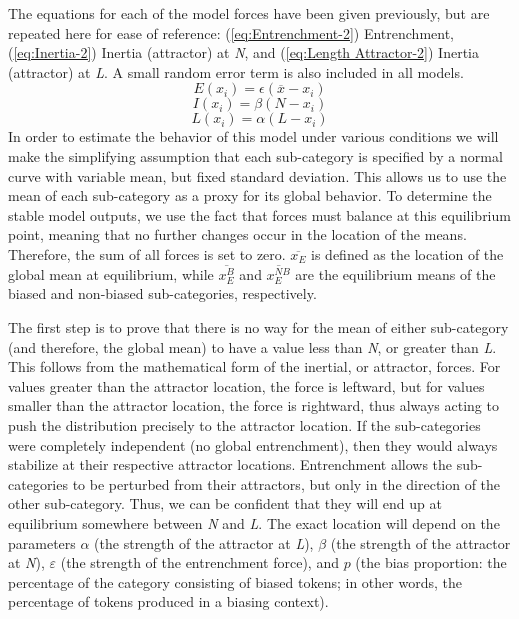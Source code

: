The equations for each of the model forces have been given previously,
but are repeated here for ease of reference: (\ref{eq:Entrenchment-2})
Entrenchment, (\ref{eq:Inertia-2}) Inertia (attractor) at \emph{N},
and (\ref{eq:Length Attractor-2}) Inertia (attractor) at\emph{ L}.
A small random error term is also included in all models. 
\begin{equation}
E(x_{i})=\epsilon(\overline{x}-x_{i})\label{eq:Entrenchment-2}
\end{equation}
\begin{equation}
I(x_{i})=\beta(N-x_{i})\label{eq:Inertia-2}
\end{equation}
\begin{equation}
L(x_{i})=\alpha(L-x_{i})\label{eq:Length Attractor-2}
\end{equation}
In order to estimate the behavior of this model under various conditions
we will make the simplifying assumption that each sub-category is
specified by a normal curve with variable mean, but fixed standard
deviation. This allows us to use the mean of each sub-category as
a proxy for its global behavior. To determine the stable model outputs,
we use the fact that forces must balance at this equilibrium point,
meaning that no further changes occur in the location of the means.
Therefore, the sum of all forces is set to zero. $\overline{x_{E}}$
is defined as the location of the global mean at equilibrium, while
$\overline{x_{E}^{B}}$ and $\overline{x_{E}^{NB}}$ are the equilibrium
means of the biased and non-biased sub-categories, respectively. 

The first step is to prove that there is no way for the mean of either
sub-category (and therefore, the global mean) to have a value less
than \emph{N}, or greater than \emph{L}. This follows from the mathematical
form of the inertial, or attractor, forces. For values greater than
the attractor location, the force is leftward, but for values smaller
than the attractor location, the force is rightward, thus always acting
to push the distribution precisely to the attractor location. If the
sub-categories were completely independent (no global entrenchment),
then they would always stabilize at their respective attractor locations.
Entrenchment allows the sub-categories to be perturbed from their
attractors, but only in the direction of the other sub-category. Thus,
we can be confident that they will end up at equilibrium somewhere
between \emph{N} and \emph{L}. The exact location will depend on the
parameters $\alpha$ (the strength of the attractor at \emph{L}),
$\beta$ (the strength of the attractor at \emph{N}), $\varepsilon$
(the strength of the entrenchment force), and $p$ (the bias proportion:
the percentage of the category consisting of biased tokens; in other
words, the percentage of tokens produced in a biasing context). 

